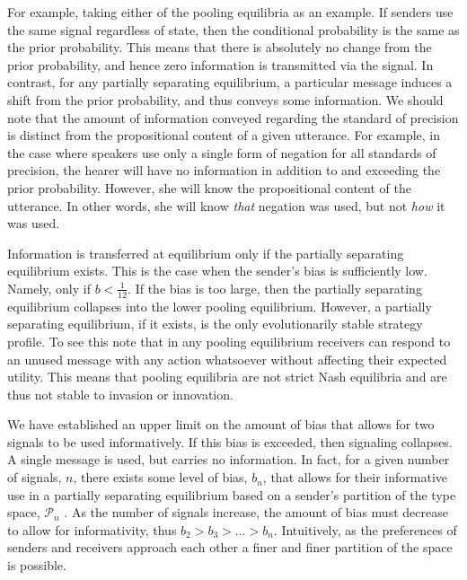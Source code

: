 For example, taking either of the pooling equilibria as an example.  If senders use the same signal regardless of state, then the conditional probability is the same as the prior probability. This means that there is absolutely no change from the prior probability, and hence zero information is transmitted via the signal. In contrast, for any partially separating equilibrium, a particular message induces a shift from the prior probability, and thus conveys some information. We should note that the amount of information conveyed regarding the standard of precision is distinct from the propositional content of a given utterance. For example, in the case where speakers use only a single form of negation for all standards of precision, the hearer will have no information in addition to and exceeding the prior probability. However, she will know the propositional content of the utterance. In other words, she will know \emph{that} negation was used, but not \emph{how} it was used.


Information is transferred at equilibrium only if the partially separating equilibrium exists. This is the case when the sender's bias is sufficiently low. Namely, only if $b < \frac{1}{12}$. If the bias is too large, then the partially separating equilibrium collapses into the lower pooling equilibrium.  However, a partially separating equilibrium, if it exists, is the only evolutionarily stable strategy profile. To see this note that in any pooling equilibrium receivers can respond to an unused message with any action whatsoever without affecting their expected utility. This means that pooling equilibria are not strict Nash equilibria and are thus not stable to invasion or innovation. 

% 

We have established an upper limit on the amount of bias that allows for two signals to be used informatively. If this bias is exceeded, then signaling collapses. A single message is used, but carries no information. In fact, for a given number of signals, $n$, there exists some level of bias, $b_n$, that allows for their informative use in a partially separating equilibrium based on a sender's partition of the type space, $\mathcal{P}_n$ \citep{crawford-sobel:1982}. As the number of signals increase, the amount of bias must decrease to allow for informativity, thus $b_2 > b_3 > ... > b_n$. Intuitively, as the preferences of senders and receivers approach each other a finer and finer partition of the space is possible.


